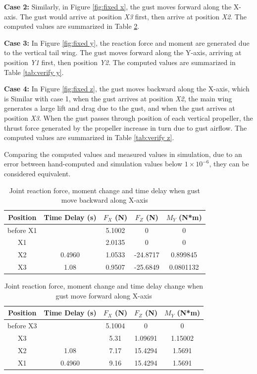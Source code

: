 \textbf{Case 2:} Similarly, in Figure \ref{fig:fixed x}, the gust moves forward along the X-axis. The gust would arrive at position \textit{X3} first, then arrive at position \textit{X2}. The computed values are summarized in Table \ref{tab:verify x}.

\textbf{Case 3:} In Figure \ref{fig:fixed y}, the reaction force and moment are generated due to the vertical tail wing. The gust moves forward along the Y-axis, arriving at position \textit{Y1} first, then position \textit{Y2}. The computed values are summarized in Table \ref{tab:verify y}.

\textbf{Case 4:} In Figure \ref{fig:fixed z}, the gust moves backward along the X-axis, which is Similar with case 1, when the gust arrives at position \textit{X2}, the main wing generates a large lift and drag due to the gust, and when the gust arrives at position \textit{X3}. When the gust passes through position of each vertical propeller, the thrust force generated by the propeller increase in turn due to gust airflow. The computed values are summarized in Table \ref{tab:verify z}.

Comparing the computed values and measured values in simulation, due to an error between hand-computed and simulation values below $1 \times 10^{-6}$, they can be considered equivalent.

\begin{table}
    \centering
    \begin{tabular}{ccccc}
    \hline
        Position & Time Delay (s) & $F_{X}$ (N) & $F_{Z}$ (N) & $M_{Y}$ (N*m) \\
    \hline
        before X1   &       & 5.1002 & 0        & 0 \\
        X1          &       & 2.0135 & 0        & 0 \\
        X2          & 0.4960 & 1.0533 & -24.8717 & 0.899845 \\
        X3          & 1.08  & 0.9507 & -25.6849  & 0.0801132\\
    \hline
    \end{tabular}
    \caption{Joint reaction force, moment change and time delay when gust move backward along X-axis}
    \label{tab:verify -x}
\end{table}

\begin{table}
    \centering
    \begin{tabular}{ccccc}
    \hline
        Position & Time Delay (s) & $F_{X}$ (N) & $F_{Z}$ (N) & $M_{Y}$ (N*m) \\
    \hline
        before X3   &       & 5.1004 & 0        & 0 \\
        X3          &       & 5.31  & 1.09691 & 1.15002 \\
        X2          & 1.08  & 7.17  & 15.4294 & 1.5691 \\
        X1          & 0.4960 & 9.16 & 15.4294 & 1.5691 \\
    \hline
    \end{tabular}
    \caption{Joint reaction force, moment change and time delay change when gust move forward along X-axis}
    \label{tab:verify x}
\end{table}

